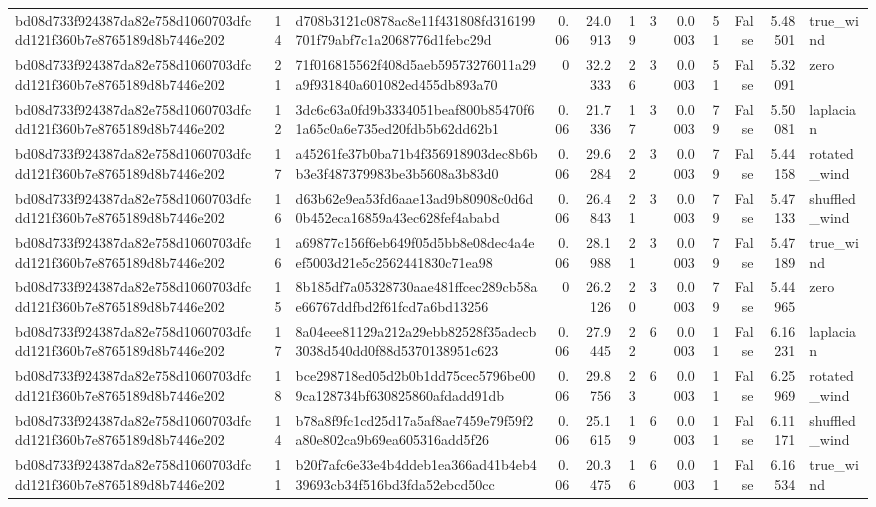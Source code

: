 \begin{tabular}{lrlrrrrrrrrl}
bd08d733f924387da82e758d1060703dfcdd121f360b7e8765189d8b7446e202 & 14 & d708b3121c0878ac8e11f431808fd316199701f79abf7c1a2068776d1febc29d & 0.06 & 24.0913 & 19 & 3 & 0.0003 & 51 & False & 5.48501 & true\_wind \\
bd08d733f924387da82e758d1060703dfcdd121f360b7e8765189d8b7446e202 & 21 & 71f016815562f408d5aeb59573276011a29a9f931840a601082ed455db893a70 & 0 & 32.2333 & 26 & 3 & 0.0003 & 51 & False & 5.32091 & zero \\
bd08d733f924387da82e758d1060703dfcdd121f360b7e8765189d8b7446e202 & 12 & 3dc6c63a0fd9b3334051beaf800b85470f61a65c0a6e735ed20fdb5b62dd62b1 & 0.06 & 21.7336 & 17 & 3 & 0.0003 & 79 & False & 5.50081 & laplacian \\
bd08d733f924387da82e758d1060703dfcdd121f360b7e8765189d8b7446e202 & 17 & a45261fe37b0ba71b4f356918903dec8b6bb3e3f487379983be3b5608a3b83d0 & 0.06 & 29.6284 & 22 & 3 & 0.0003 & 79 & False & 5.44158 & rotated\_wind \\
bd08d733f924387da82e758d1060703dfcdd121f360b7e8765189d8b7446e202 & 16 & d63b62e9ea53fd6aae13ad9b80908c0d6d0b452eca16859a43ec628fef4ababd & 0.06 & 26.4843 & 21 & 3 & 0.0003 & 79 & False & 5.47133 & shuffled\_wind \\
bd08d733f924387da82e758d1060703dfcdd121f360b7e8765189d8b7446e202 & 16 & a69877c156f6eb649f05d5bb8e08dec4a4eef5003d21e5c2562441830c71ea98 & 0.06 & 28.1988 & 21 & 3 & 0.0003 & 79 & False & 5.47189 & true\_wind \\
bd08d733f924387da82e758d1060703dfcdd121f360b7e8765189d8b7446e202 & 15 & 8b185df7a05328730aae481ffcec289cb58ae66767ddfbd2f61fcd7a6bd13256 & 0 & 26.2126 & 20 & 3 & 0.0003 & 79 & False & 5.44965 & zero \\
bd08d733f924387da82e758d1060703dfcdd121f360b7e8765189d8b7446e202 & 17 & 8a04eee81129a212a29ebb82528f35adecb3038d540dd0f88d5370138951c623 & 0.06 & 27.9445 & 22 & 6 & 0.0003 & 11 & False & 6.16231 & laplacian \\
bd08d733f924387da82e758d1060703dfcdd121f360b7e8765189d8b7446e202 & 18 & bce298718ed05d2b0b1dd75cec5796be009ca128734bf630825860afdadd91db & 0.06 & 29.8756 & 23 & 6 & 0.0003 & 11 & False & 6.25969 & rotated\_wind \\
bd08d733f924387da82e758d1060703dfcdd121f360b7e8765189d8b7446e202 & 14 & b78a8f9fc1cd25d17a5af8ae7459e79f59f2a80e802ca9b69ea605316add5f26 & 0.06 & 25.1615 & 19 & 6 & 0.0003 & 11 & False & 6.11171 & shuffled\_wind \\
bd08d733f924387da82e758d1060703dfcdd121f360b7e8765189d8b7446e202 & 11 & b20f7afc6e33e4b4ddeb1ea366ad41b4eb439693cb34f516bd3fda52ebcd50cc & 0.06 & 20.3475 & 16 & 6 & 0.0003 & 11 & False & 6.16534 & true\_wind \\

\end{tabular}
